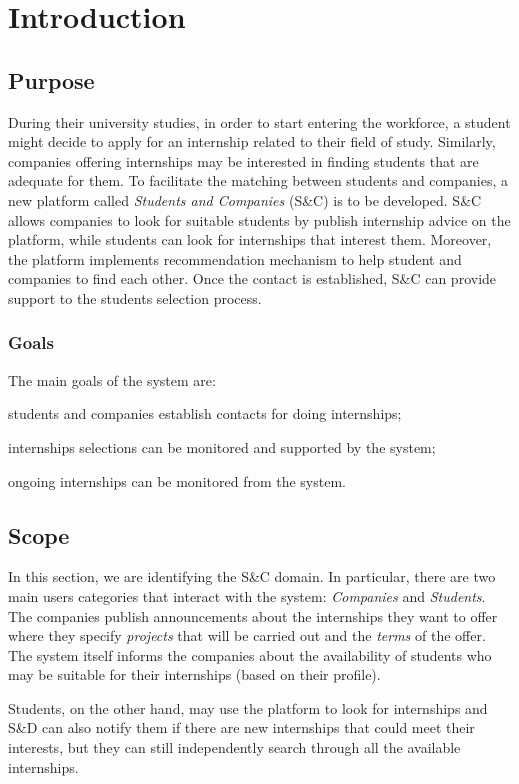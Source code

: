 \setchapterpreamble[u]{\margintoc}
\chapter{Introduction}
	\section{Purpose}
		During their university studies, in order to start entering the workforce, a student might decide to apply for an internship related to their field of study. Similarly, companies offering internships may be interested in finding students that are adequate for them. To facilitate the matching between students and companies, a new platform called \emph{Students and Companies} (S\&C) is to be developed. S\&C allows companies to look for suitable students by publish internship advice on the platform, while students can look for internships that interest them. Moreover, the platform implements recommendation mechanism to help student and companies to find each other. Once the contact is established, S\&C can provide support to the students selection process.
		\subsection{Goals}
			The main goals of the system are:
			
			\quad [G1]\quad students and companies establish contacts for doing internships;
			
			\quad [G2]\quad internships selections can be monitored and supported by the system;
			
			\quad [G3]\quad ongoing internships can be monitored from the system.
	\section{Scope}
		In this section, we are identifying the S\&C domain. In particular, there are two main users categories that interact with the system: \emph{Companies} and \emph{Students}. The companies publish announcements about the internships they want to offer where they specify \emph{projects} that will be carried out and the \emph{terms} of the offer. The system itself informs the companies about the availability of students who may be suitable for their internships (based on their profile).
		
		Students, on the other hand, may use the platform to look for internships and S\&D can also notify them if there are new internships that could meet their interests, but they can still independently search through all the available internships.
		
